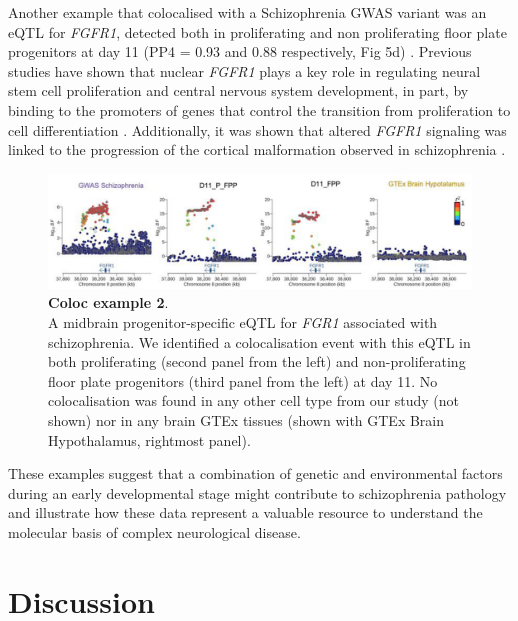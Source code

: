 Another example that colocalised with a Schizophrenia GWAS variant was an eQTL for
\textit{FGFR1}, detected both in proliferating and non proliferating floor plate progenitors at day 11 (PP4 = 0.93 and 0.88 respectively, Fig 5d) . 
Previous studies have shown that nuclear \textit{FGFR1} plays a key role in regulating neural stem cell proliferation and central nervous system development, in part, by binding to the promoters of genes that control the transition from proliferation to cell differentiation \cite{ma2009molecular}. 
Additionally, it was shown that altered \textit{FGFR1} signaling was linked to the progression of the cortical malformation observed in schizophrenia \cite{stachowiak2017cerebral}.\\

\begin{figure}[h]
\centering
\includegraphics[width=16cm]{Chapter5/Fig/neuroseq_coloc_example2_FGFR1.png}
\caption[Coloc example 2]{\textbf{Coloc example 2}.\\
A midbrain progenitor-specific eQTL for \textit{FGR1} associated with schizophrenia. 
We identified a colocalisation event with this eQTL in both proliferating (second panel from the left) and non-proliferating floor plate progenitors (third panel from the left) at day 11. 
No colocalisation was found in any other cell type from our study (not shown) nor in any brain GTEx tissues (shown with GTEx Brain Hypothalamus, rightmost panel).}
\label{fig:neuroseq_coloc_example2}
\end{figure}

These examples suggest that a combination of genetic and environmental factors during an early developmental stage might contribute to schizophrenia pathology and illustrate how these data represent a valuable resource to understand the molecular basis of complex neurological disease.

\clearpage

\section{Discussion}


